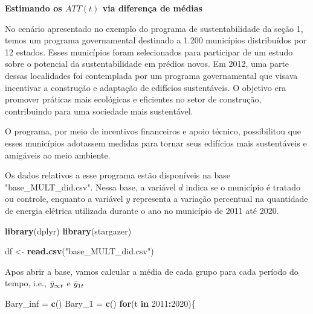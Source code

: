 \documentclass[portugues]{article}
\newenvironment{Shaded}{\begin{snugshade}}{\end{snugshade}}
\newcommand{\ControlFlowTok}[1]{\textcolor[rgb]{0.13,0.29,0.53}{\textbf{#1}}}
\newcommand{\DecValTok}[1]{\textcolor[rgb]{0.00,0.00,0.81}{#1}}
\newcommand{\FunctionTok}[1]{\textcolor[rgb]{0.13,0.29,0.53}{\textbf{#1}}}
\newcommand{\NormalTok}[1]{#1}
\newcommand{\OtherTok}[1]{\textcolor[rgb]{0.56,0.35,0.01}{#1}}
\newcommand{\SpecialCharTok}[1]{\textcolor[rgb]{0.81,0.36,0.00}{\textbf{#1}}}
\newcommand{\StringTok}[1]{\textcolor[rgb]{0.31,0.60,0.02}{#1}}
\begin{document}
\begin{boxA}

    \textbf{Estimando os $ATT(t)$ via diferença de médias}

    \vspace{5}
   
    No cenário apresentado no exemplo do programa de sustentabilidade da seção 1, temos um programa governamental destinado a 1.200 municípios distribuídos por 12 estados. Esses municípios foram selecionados para participar de um estudo sobre o potencial da sustentabilidade em prédios novos. Em 2012, uma parte dessas localidades foi contemplada por um programa governamental que visava incentivar a construção e adaptação de edifícios sustentáveis. O objetivo era promover práticas mais ecológicas e eficientes no setor de construção, contribuindo para uma sociedade mais sustentável.

    O programa, por meio de incentivos financeiros e apoio técnico, possibilitou que esses municípios adotassem medidas para tornar seus edifícios mais sustentáveis e amigáveis ao meio ambiente.

    Os dados relativos a esse programa estão disponíveis na base "base\_MULT\_did.csv". Nessa base, a variável $d$ indica se o município é tratado ou controle, enquanto a variável $y$ representa a variação percentual na quantidade de energia elétrica utilizada durante o ano no município de 2011 até 2020. 

    \begin{Shaded}
    \begin{Highlighting}[]
    \FunctionTok{library}\NormalTok{(dplyr)}
    \FunctionTok{library}\NormalTok{(stargazer)}
    
    \NormalTok{df }\OtherTok{\textless{}{-}} \FunctionTok{read.csv}\NormalTok{(}\StringTok{"base\_MULT\_did.csv"}\NormalTok{)}
    \end{Highlighting}
    \end{Shaded}
    
    Apos abrir a base, vamos calcular a média de cada grupo para cada  período do tempo, i.e., 
  \(\Bar{y}_{\infty t}\) e \(\Bar{y}_{1t}\)

    \begin{Shaded}
    \begin{Highlighting}[]
    \NormalTok{Bary\_inf }\OtherTok{=} \FunctionTok{c}\NormalTok{()}
    \NormalTok{Bary\_1 }\OtherTok{=} \FunctionTok{c}\NormalTok{()}
    \ControlFlowTok{for}\NormalTok{(t }\ControlFlowTok{in} \DecValTok{2011}\SpecialCharTok{:}\DecValTok{2020}\NormalTok{)\{}
      

\end{Highlighting}
\end{Shaded}
\end{boxA}
\end{document}
